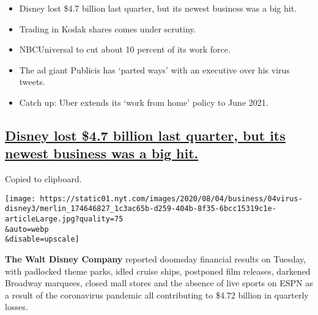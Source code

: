 \begin{itemize}
\item
  \protect\hyperlink{disney-lost-4-7-billion-last-quarter-but-its-newest-business-was-a-big-hit}{}

  Disney lost \$4.7 billion last quarter, but its newest business was a
  big hit.
\item
  \protect\hyperlink{trading-in-kodak-shares-comes-under-scrutiny}{}

  Trading in Kodak shares comes under scrutiny.
\item
  \protect\hyperlink{nbcuniversal-to-cut-about-10-percent-of-its-work-force}{}

  NBCUniversal to cut about 10 percent of its work force.
\item
  \protect\hyperlink{the-ad-giant-publicis-has-parted-ways-with-an-executive-over-his-virus-tweets}{}

  The ad giant Publicis has `parted ways' with an executive over his
  virus tweets.
\item
  \protect\hyperlink{catch-up-uber-extends-its-work-from-home-policy-to-june-2021}{}

  Catch up: Uber extends its `work from home' policy to June 2021.
\end{itemize}

\hypertarget{disney-lost-47-billion-last-quarter-but-its-newest-business-was-a-big-hit}{%
\subsection{\texorpdfstring{\protect\hyperlink{disney-lost-4-7-billion-last-quarter-but-its-newest-business-was-a-big-hit}{Disney
lost \$4.7 billion last quarter, but its newest business was a big
hit.}}{Disney lost \$4.7 billion last quarter, but its newest business was a big hit.}}\label{disney-lost-47-billion-last-quarter-but-its-newest-business-was-a-big-hit}}

Copied to clipboard.

\texttt{[image: https://static01.nyt.com/images/2020/08/04/business/04virus-disney3/merlin\_174646827\_1c3ac65b-d259-404b-8f35-6bcc15319c1e-articleLarge.jpg?quality=75\\\&auto=webp\\\&disable=upscale]}

\textbf{The Walt Disney Company} reported doomsday financial results on
Tuesday, with padlocked theme parks, idled cruise ships, postponed film
releases, darkened Broadway marquees, closed mall stores and the absence
of live sports on ESPN as a result of the coronavirus pandemic all
contributing to \$4.72 billion in quarterly losses.

